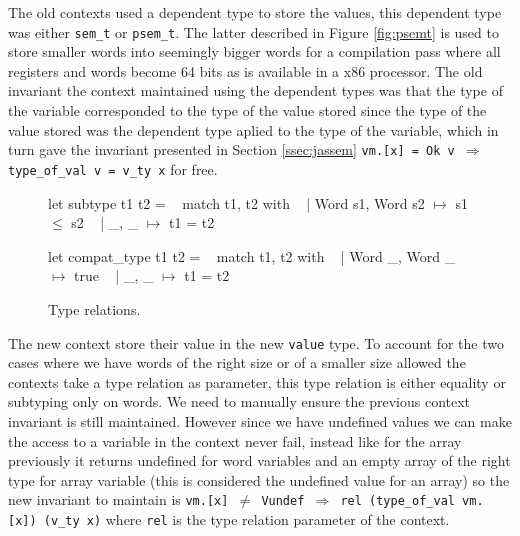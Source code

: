 \documentclass{article}
\begin{document}
The old contexts used a dependent type to store the values, this dependent type
was either \texttt{sem\_t} or \texttt{psem\_t}. The latter described in Figure
\ref{fig:psemt} is used to store smaller words into seemingly bigger words for
a compilation pass where all registers and words become 64 bits as is available
in a x86 processor. The old invariant the context maintained using the dependent
types was that the type of the variable corresponded to the type of the value
stored since the type of the value stored was the dependent type aplied to the
type of the variable, which in turn gave the invariant presented in Section
\ref{ssec:jassem}
\texttt{vm.[x] = Ok v \(\Longrightarrow\) type\_of\_val v = v\_ty x} for free.

\begin{figure}[t]
\obeylines\obeyspaces\ttfamily%
let subtype t1 t2 =
~ match t1, t2 with
~ | Word s1, Word s2 \(\mapsto\) s1 \(\leq\) s2
~ | \_,       \_       \(\mapsto\) t1 = t2

let compat\_type t1 t2 =
~ match t1, t2 with
~ | Word \_, Word \_ \(\mapsto\) true
~ | \_,      \_      \(\mapsto\) t1 = t2
\normalfont%
\caption{Type relations.}
\end{figure}

The new context store their value in the new \texttt{value} type. To account for
the two cases where we have words of the right size or of a smaller size allowed
the contexts take a type relation as parameter, this type relation is either
equality or subtyping only on words. We need to manually ensure the previous
context invariant is still maintained. However since we have undefined values we
can make the access to a variable in the context never fail, instead like for
the array previously it returns undefined for word variables and an empty array
of the right type for array variable (this is considered the undefined value for
an array) so the new invariant to maintain is
\texttt{vm.[x] \(\neq\) Vundef \(\Longrightarrow\) rel (type\_of\_val vm.[x]) (v\_ty x)}
where \texttt{rel} is the type relation parameter of the context.

\medskip
\end{document}
